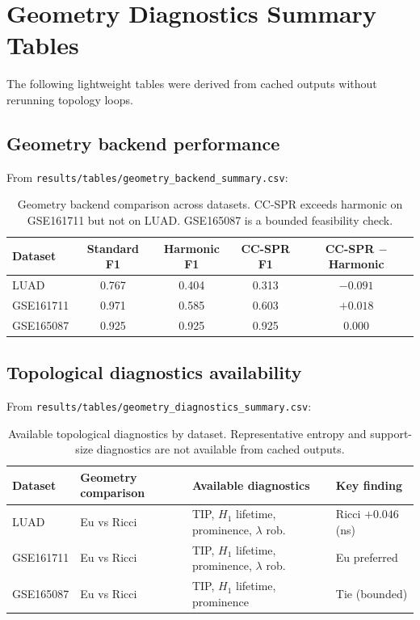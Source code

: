 \documentclass[11pt]{article}
\begin{document}
\section{Geometry Diagnostics Summary Tables}

The following lightweight tables were derived from cached outputs without rerunning topology loops.

\subsection{Geometry backend performance}
From \texttt{results/tables/geometry\_backend\_summary.csv}:

\begin{table}[h]
\centering
\small
\begin{tabular}{lcccc}
\toprule
Dataset & Standard F1 & Harmonic F1 & CC-SPR F1 & CC-SPR $-$ Harmonic \\
\midrule
LUAD & 0.767 & 0.404 & 0.313 & $-0.091$ \\
GSE161711 & 0.971 & 0.585 & 0.603 & $+0.018$ \\
GSE165087 & 0.925 & 0.925 & 0.925 & $0.000$ \\
\bottomrule
\end{tabular}
\caption{Geometry backend comparison across datasets.
CC-SPR exceeds harmonic on GSE161711 but not on LUAD.
GSE165087 is a bounded feasibility check.}
\end{table}

\subsection{Topological diagnostics availability}
From \texttt{results/tables/geometry\_diagnostics\_summary.csv}:

\begin{table}[h]
\centering
\small
\begin{tabular}{llll}
\toprule
Dataset & Geometry comparison & Available diagnostics & Key finding \\
\midrule
LUAD & Eu vs Ricci & TIP, $H_1$ lifetime, prominence, $\lambda$ rob. & Ricci $+0.046$ (ns) \\
GSE161711 & Eu vs Ricci & TIP, $H_1$ lifetime, prominence, $\lambda$ rob. & Eu preferred \\
GSE165087 & Eu vs Ricci & TIP, $H_1$ lifetime, prominence & Tie (bounded) \\
\bottomrule
\end{tabular}
\caption{Available topological diagnostics by dataset.
Representative entropy and support-size diagnostics are not available from cached outputs.}
\end{table}
\end{document}
